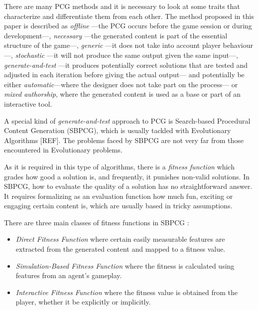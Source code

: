 \documentclass[runningheads,a4paper]{llncs}
\begin{document}
There are many PCG methods and it is necessary to look at some traits that 
characterize and differentiate them from each 
other\cite{togelius2016introduction}. The method proposed in this paper is 
described as \textit{offline} ---the PCG occurs before the game session or 
during development---, \textit{necessary} ---the generated content is part of 
the essential structure of the game---, \textit{generic} ---it does not take 
into account player behaviour---, \textit{stochastic} ---it will not produce 
the same output given the same input---, \textit{generate-and-test} ---it 
produces potentially correct solutions that are tested and adjusted in each 
iteration before giving the actual output--- and potentially be either 
\textit{automatic}---where the designer does not take part on the process--- or 
\textit{mixed authorship}, where the generated content is used as a base or 
part of an interactive tool. 

A special kind of \textit{generate-and-test} approach to PCG is
Search-based Procedural Content Generation (SBPCG), which is
usually tackled with Evolutionary Algorithms [REF]. 
The problems faced by SBPCG are not very far from those encountered in Evolutionary problems.  

As it is required in this type of algorithms, there is a \textit{fitness function} which grades how good a solution is, and frequently, it punishes non-valid solutions. 
In SBPCG, how to evaluate the quality of a solution has no straightforward answer. It requires formalizing as an evaluation function how much fun, exciting or engaging certain content is, which are usually based in tricky assumptions.

There are three main classes of fitness functions in 
SBPCG \cite{togelius2010search}:

\begin{itemize}
	\item \textit{Direct Fitness Function} where certain easily measurable 
	features are extracted from the generated content and mapped to a 
	fitness value.
	\item \textit{Simulation-Based Fitness Function} where the 
	fitness is calculated using features from an agent's gameplay. 
	\item \textit{Interactive Fitness Function} where the fitness value is 
	obtained from the player, whether it be explicitly or 
	implicitly. 
\end{itemize}
\end{document}
